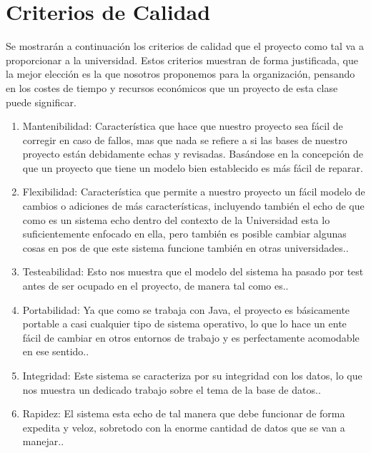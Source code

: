 \documentclass[a4paper,12pt,openany,oneside]{book}
\begin{document}
\section{Criterios de Calidad}

Se mostrarán a continuación los criterios de calidad que el proyecto como tal va a proporcionar a la universidad. Estos criterios muestran de forma justificada, que la mejor elección es la que nosotros proponemos para la organización, pensando en los costes de tiempo y recursos económicos que un proyecto de esta clase puede significar.

\begin{enumerate}

\item Mantenibilidad: Característica que hace que nuestro proyecto sea fácil de corregir en caso de fallos, mas que nada se refiere a si las bases de nuestro proyecto están debidamente echas y revisadas. Basándose en la concepción de que un proyecto que tiene un modelo bien establecido es más fácil de reparar\cite{data11}.

\item Flexibilidad: Característica que permite a nuestro proyecto un fácil modelo de cambios o adiciones de más características, incluyendo también el echo de que como es un sistema echo dentro del contexto de la Universidad esta lo suficientemente enfocado en ella, pero también es posible cambiar algunas cosas en pos de que este sistema funcione también en otras universidades.\cite{data11}.

\item Testeabilidad: Esto nos muestra que el modelo del sistema ha pasado por test antes de ser ocupado en el proyecto, de manera tal como es.\cite{data11}.

\item Portabilidad: Ya que como se trabaja con Java, el proyecto es básicamente portable a casi cualquier tipo de sistema operativo, lo que lo hace un ente fácil de cambiar en otros entornos de trabajo y es perfectamente acomodable en ese sentido.\cite{data11}.

\item Integridad: Este sistema se caracteriza por su integridad con los datos, lo que nos muestra un dedicado trabajo sobre el tema de la base de datos.\cite{data11}.

\item Rapidez: El sistema esta echo de tal manera que debe funcionar de forma expedita y veloz, sobretodo con la enorme cantidad de datos que se van a manejar.\cite{data11}.

\end{enumerate}




\end{document}
